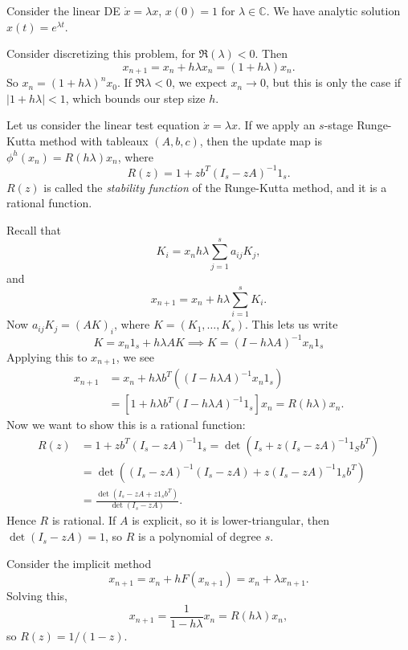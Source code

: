 \documentclass[12pt]{article}
\begin{document}
Consider the linear DE $\dot x = \lambda x$, $x(0) = 1$ for $\lambda \in \mathbb{C}$. We have analytic solution $x(t) = e^{\lambda t}$.

Consider discretizing this problem, for $\Re(\lambda) < 0$. Then
\[
x_{n+1} = x_n + h \lambda x_n = (1 + h \lambda) x_n.
\]
So $x_n = (1 + h \lambda)^n x_0$. If $\Re \lambda < 0$, we expect $x_n \to 0$, but this is only the case if $|1 + h \lambda| < 1$, which bounds our step size $h$.


\begin{lemma}
	Let us consider the linear test equation $\dot x = \lambda x$. If we apply an $s$-stage Runge-Kutta method with tableaux $(A, b, c)$, then the update map is $\phi^{h}(x_n) = R(h \lambda) x_n$, where
	\[
	R(z) = 1 + z b^{T} (I_s - z A)^{-1} 1_s.
	\]
	$R(z)$ is called the \emph{stability function} of the Runge-Kutta method, and it is a rational function.
\end{lemma}

\begin{proofbox}
	Recall that
	\[
	K_i = x_n h \lambda \sum_{j = 1}^s a_{ij} K_j,
	\]
	and
	\[
	x_{n+1} = x_n + h \lambda \sum_{i = 1}^s K_i.
	\]
	Now $a_{ij} K_j = (A K)_i$, where $K = (K_1, \ldots, K_s)$. This lets us write
	\[
	K = x_n 1_s + h \lambda A K \implies K = (I - h \lambda A)^{-1} x_n 1_s
	\]
	Applying this to $x_{n+1}$, we see
	\begin{align*}
		x_{n+1} &= x_n + h \lambda b^{T} ((I - h \lambda A)^{-1} x_n 1_s) \\
			&= [1 + h \lambda b^{T}(I - h \lambda A)^{-1} 1_s] x_n = R(h \lambda) x_n.
	\end{align*}
	Now we want to show this is a rational function:
	\begin{align*}
		R(z) &= 1 + z b^{T}(I_s - zA)^{-1} 1_s = \det(I_s + z(I_s - zA)^{-1} 1_S b^{T}) \\
		     &= \det((I_s - zA)^{-1} (I_s - zA) + z(I_s - zA)^{-1} 1_s b^{T}) \\
		     &= \frac{\det(I_s - z A + z 1_s b^{T})}{\det(I_s - z A)}.
	\end{align*}
	Hence $R$ is rational. If $A$ is explicit, so it is lower-triangular, then $\det(I_s - zA) = 1$, so $R$ is a polynomial of degree $s$.
\end{proofbox}

\begin{exbox}
	Consider the implicit method
	\[
	x_{n+1} = x_n + h F(x_{n+1}) = x_n + \lambda x_{n+1}.
	\]
	Solving this,
	\[
	x_{n+1} = \frac{1}{1 - h \lambda} x_n = R(h \lambda) x_n,
	\]
	so $R(z) = 1/(1 - z)$.
\end{exbox}
\end{document}

